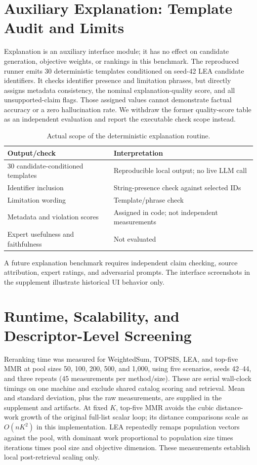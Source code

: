 \documentclass[12pt,a4paper]{article}
\begin{document}
\section{Auxiliary Explanation: Template Audit and Limits}
\label{sec:rag_eval}

Explanation is an auxiliary interface module; it has no effect on candidate generation, objective weights, or rankings in this benchmark. The reproduced runner emits 30 deterministic templates conditioned on seed-42 LEA candidate identifiers. It checks identifier presence and limitation phrases, but directly assigns metadata consistency, the nominal explanation-quality score, and all unsupported-claim flags. Those assigned values cannot demonstrate factual accuracy or a zero hallucination rate. We withdraw the former quality-score table as an independent evaluation and report the executable check scope instead.

\begin{table}[H]\centering\small
\caption{Actual scope of the deterministic explanation routine.}\label{tab:rag_results}
\begin{tabular}{p{5.0cm}p{8.4cm}}
\toprule
Output/check & Interpretation\\\midrule
30 candidate-conditioned templates & Reproducible local output; no live LLM call\\
Identifier inclusion & String-presence check against selected IDs\\
Limitation wording & Template/phrase check\\
Metadata and violation scores & Assigned in code; not independent measurements\\
Expert usefulness and faithfulness & Not evaluated\\
\bottomrule\end{tabular}\end{table}
A future explanation benchmark requires independent claim checking, source attribution, expert ratings, and adversarial prompts. The interface screenshots in the supplement illustrate historical UI behavior only.

\section{Runtime, Scalability, and Descriptor-Level Screening}
\label{sec:robustness}

Reranking time was measured for WeightedSum, TOPSIS, LEA, and top-five MMR at pool sizes 50, 100, 200, 500, and 1,000, using five scenarios, seeds 42--44, and three repeats (45 measurements per method/size). These are serial wall-clock timings on one machine and exclude shared catalog scoring and retrieval. Mean and standard deviation, plus the raw measurements, are supplied in the supplement and artifacts. At fixed $K$, top-five MMR avoids the cubic distance-work growth of the original full-list scalar loop; its distance comparisons scale as $O(nK^2)$ in this implementation. LEA repeatedly remaps population vectors against the pool, with dominant work proportional to population size times iterations times pool size and objective dimension. These measurements establish local post-retrieval scaling only.
\end{document}
